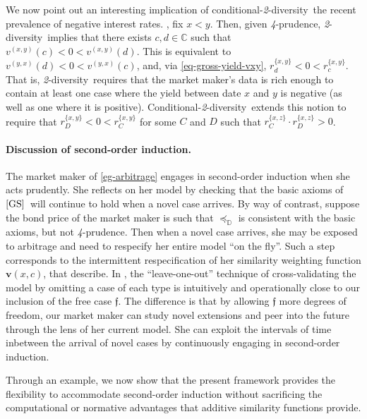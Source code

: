 \documentclass[12pt,a4paper,twoside]{article}
\newcommand{\gsii}{$\textup{[GS]}$}
\newcommand{\novel}{\mathfrak f}
\newcommand{\mbbd}{{\mathds D}}
\newcommand{\mbbc}{{\mathds C}}
\newcommand{\xy}{{(x, y)}}
\newcommand{\yx}{{(y, x)}}
\newcommand{\fourpru}{\textit{4}-\textup{prudence}}
\newcommand{\condtwodiv}{\textup{conditional-\textit{2}-diversity}}
\newcommand{\Condtwodiv}{\textup{Conditional-\textit{2}-diversity}}
\newcommand{\twodiv}{\textit{2}-\textup{diversity}}
\begin{document}
\begin{example}
We now point out an interesting implication of \condtwodiv\ the recent
prevalence of negative interest rates. \Wlog, fix $x<y$. Then, given \fourpru,
\twodiv\ implies that there exists $c,d \in \mbbc$ such that
$v^{\xy}(c) < 0 < v^{\xy}(d)$. This is equivalent to
$v^{\yx}(d) < 0 < v^{\yx}(c)$, and, via \cref{eq-gross-yield-vxy},
$r^{\{x,y\}}_{d} < 0 < r^{\{x,y\}}_{c}$. That is, \twodiv\ requires that the
market maker's data is rich enough to contain at least one case where the yield
between date $x$ and $y$ is negative (as well as one where it is
positive). %
\Condtwodiv\ extends this notion to require that
$r^{\{x,y\}}_{D} < 0 < r^{\{x,y\}}_{C}$ for some $C$ and $D$ such that
$r^{\{x,z\}}_{C}\cdot r^{\{x,z\}}_{D} >0$.
  \end{example}


  \paragraph{Discussion of second-order induction.}\vskip-8pt
  The market maker of \cref{eg-arbitrage} engages in second-order induction when
  she acts prudently. She reflects on her model by checking that the basic
  axioms of \gsii\ will continue to hold when a novel case arrives. By way of
  contrast, suppose  the bond price of the market maker is such that
  $\preceq_{\mbbd}$ is consistent with the basic axioms, but not \fourpru. Then
  when a novel case arrives, she may be exposed to arbitrage and need to
  respecify her entire model ``on the fly''. Such a step corresponds to the
  intermittent respecification of her similarity weighting function
  $\mathbf{v}(x,c)$, that \citet[p.10324]{AG-Second-order_induction}
  describe. In \citet{AG-Second-order_induction}, the ``leave-one-out''
  technique of cross-validating the model by omitting a case of each type is
  intuitively and operationally close to our inclusion of the free case
  $\novel$. The difference is that by allowing $\novel $ more degrees of
  freedom, our market maker can study novel extensions and peer into the future
  through the lens of her current model. She can exploit the intervals of time
  inbetween the arrival of novel cases by continuously engaging in second-order
  induction.

  Through an example, we now show that the present framework provides the
  flexibility to accommodate second-order induction without sacrificing the
  computational or normative advantages that additive similarity functions
  provide.
\end{document}
